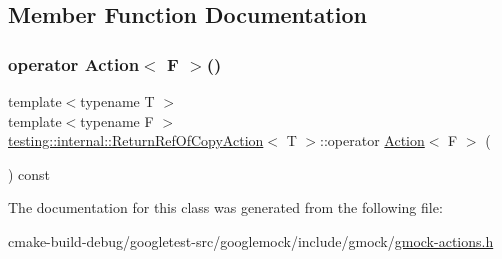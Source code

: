 \subsection{Member Function Documentation}
\mbox{\label{classtesting_1_1internal_1_1ReturnRefOfCopyAction_a8b4829fbb46c3ca6468f3eb5c5b42493}} 
\subsubsection{\texorpdfstring{operator Action$<$ F $>$()}{operator Action< F >()}}
{\footnotesize\ttfamily template$<$typename T $>$ \\
template$<$typename F $>$ \\
\mbox{\hyperlink{classtesting_1_1internal_1_1ReturnRefOfCopyAction}{testing\+::internal\+::\+Return\+Ref\+Of\+Copy\+Action}}$<$ T $>$\+::operator \mbox{\hyperlink{classtesting_1_1Action}{Action}}$<$ F $>$ (\begin{DoxyParamCaption}{ }\end{DoxyParamCaption}) const\hspace{0.3cm}{\ttfamily [inline]}}



The documentation for this class was generated from the following file\+:\begin{DoxyCompactItemize}
\item 
cmake-\/build-\/debug/googletest-\/src/googlemock/include/gmock/\mbox{\hyperlink{gmock-actions_8h}{gmock-\/actions.\+h}}\end{DoxyCompactItemize}
